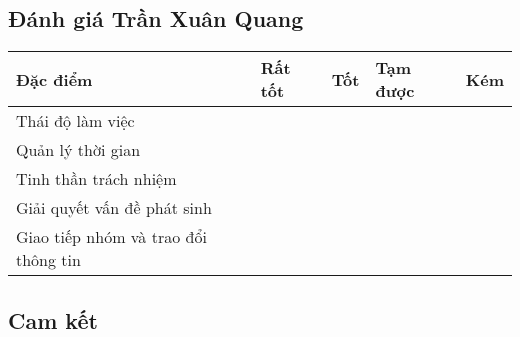 \documentclass{article}
\begin{document}
\subsection{Đánh giá Trần Xuân Quang}
\begin{tabularx}{\textwidth}{|X|X|X|X|X|}
\hline
\textbf{Đặc điểm} & \textbf{Rất tốt} & \textbf{Tốt} & \textbf{Tạm được} & \textbf{Kém} \\
\hline
Thái độ làm việc &  & & & \\
\hline
Quản lý thời gian & &  & & \\
\hline
Tinh thần trách nhiệm &  & & & \\
\hline
Giải quyết vấn đề phát sinh & &  & & \\
\hline
Giao tiếp nhóm và trao đổi thông tin &  & & & \\
\hline
\end{tabularx}

\subsection{Cam kết}
\begin{figure}[htbp]
    \centering
     \\
     \\
    \\
    \\
    \\
\end{figure}
\end{document}

